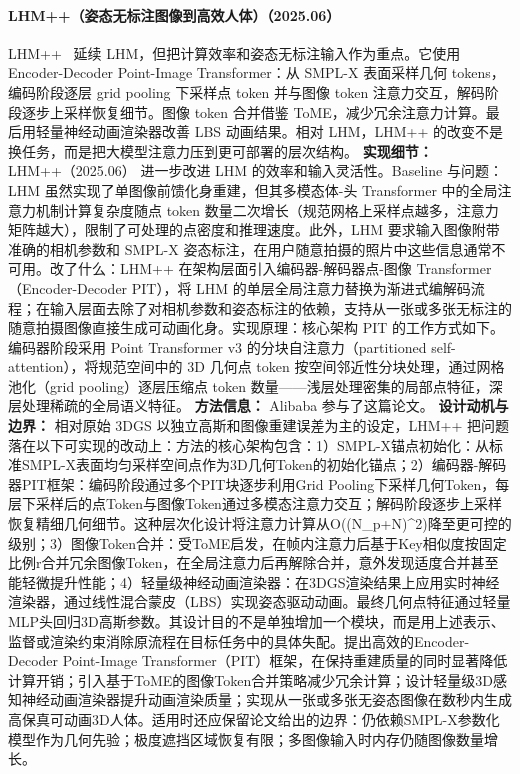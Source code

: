 \paragraph{LHM++（姿态无标注图像到高效人体）（2025.06）}
LHM++~\cite{2506_13766} 延续 LHM，但把计算效率和姿态无标注输入作为重点。它使用 Encoder-Decoder Point-Image Transformer：从 SMPL-X 表面采样几何 tokens，编码阶段逐层 grid pooling 下采样点 token 并与图像 token 注意力交互，解码阶段逐步上采样恢复细节。图像 token 合并借鉴 ToME，减少冗余注意力计算。最后用轻量神经动画渲染器改善 LBS 动画结果。相对 LHM，LHM++ 的改变不是换任务，而是把大模型注意力压到更可部署的层次结构。
\textbf{实现细节：} LHM++（2025.06） 进一步改进 LHM 的效率和输入灵活性。Baseline 与问题：LHM 虽然实现了单图像前馈化身重建，但其多模态体-头 Transformer 中的全局注意力机制计算复杂度随点 token 数量二次增长（规范网格上采样点越多，注意力矩阵越大），限制了可处理的点密度和推理速度。此外，LHM 要求输入图像附带准确的相机参数和 SMPL-X 姿态标注，在用户随意拍摄的照片中这些信息通常不可用。改了什么：LHM++ 在架构层面引入编码器-解码器点-图像 Transformer（Encoder-Decoder PIT），将 LHM 的单层全局注意力替换为渐进式编解码流程；在输入层面去除了对相机参数和姿态标注的依赖，支持从一张或多张无标注的随意拍摄图像直接生成可动画化身。实现原理：核心架构 PIT 的工作方式如下。编码器阶段采用 Point Transformer v3 的分块自注意力（partitioned self-attention），将规范空间中的 3D 几何点 token 按空间邻近性分块处理，通过网格池化（grid pooling）逐层压缩点 token 数量——浅层处理密集的局部点特征，深层处理稀疏的全局语义特征。
\textbf{方法信息：} Alibaba 参与了这篇论文。
\textbf{设计动机与边界：} 相对原始 3DGS 以独立高斯和图像重建误差为主的设定，LHM++ 把问题落在以下可实现的改动上：方法的核心架构包含：1）SMPL-X锚点初始化：从标准SMPL-X表面均匀采样空间点作为3D几何Token的初始化锚点；2）编码器-解码器PIT框架：编码阶段通过多个PIT块逐步利用Grid Pooling下采样几何Token，每层下采样后的点Token与图像Token通过多模态注意力交互；解码阶段逐步上采样恢复精细几何细节。这种层次化设计将注意力计算从O((N\_p+N)\^{}2)降至更可控的级别；3）图像Token合并：受ToME启发，在帧内注意力后基于Key相似度按固定比例r合并冗余图像Token，在全局注意力后再解除合并，意外发现适度合并甚至能轻微提升性能；4）轻量级神经动画渲染器：在3DGS渲染结果上应用实时神经渲染器，通过线性混合蒙皮（LBS）实现姿态驱动动画。最终几何点特征通过轻量MLP头回归3D高斯参数。其设计目的不是单独增加一个模块，而是用上述表示、监督或渲染约束消除原流程在目标任务中的具体失配。提出高效的Encoder-Decoder Point-Image Transformer（PIT）框架，在保持重建质量的同时显著降低计算开销；引入基于ToME的图像Token合并策略减少冗余计算；设计轻量级3D感知神经动画渲染器提升动画渲染质量；实现从一张或多张无姿态图像在数秒内生成高保真可动画3D人体。适用时还应保留论文给出的边界：仍依赖SMPL-X参数化模型作为几何先验；极度遮挡区域恢复有限；多图像输入时内存仍随图像数量增长。
